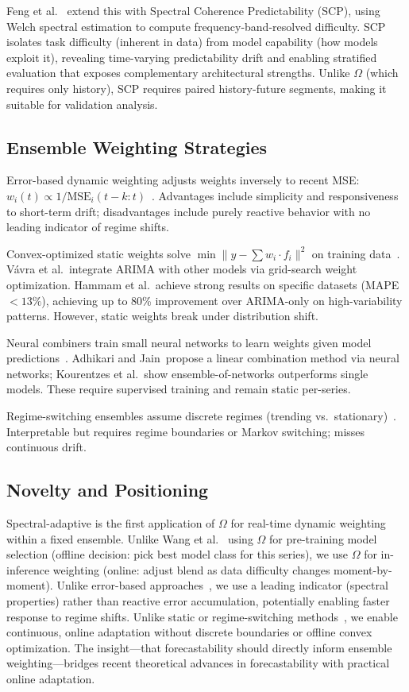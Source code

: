 \documentclass[11pt,letterpaper]{article}
\begin{document}
Feng et al.~\cite{Feng2025} extend this with Spectral Coherence Predictability (SCP), using Welch spectral estimation to compute frequency-band-resolved difficulty. SCP isolates task difficulty (inherent in data) from model capability (how models exploit it), revealing time-varying predictability drift and enabling stratified evaluation that exposes complementary architectural strengths. Unlike $\Omega$ (which requires only history), SCP requires paired history-future segments, making it suitable for validation analysis.

\subsection{Ensemble Weighting Strategies}

Error-based dynamic weighting adjusts weights inversely to recent MSE: $w_i(t) \propto 1/\text{MSE}_i(t-k:t)$~\cite{Sun2017}. Advantages include simplicity and responsiveness to short-term drift; disadvantages include purely reactive behavior with no leading indicator of regime shifts.

Convex-optimized static weights solve $\min \|y - \sum w_i \cdot f_i\|^2$ on training data~\cite{Vvra2026,Hammam2025}. Vávra et al.~integrate ARIMA with other models via grid-search weight optimization. Hammam et al.~achieve strong results on specific datasets (MAPE $< 13\%$), achieving up to 80\% improvement over ARIMA-only on high-variability patterns. However, static weights break under distribution shift.

Neural combiners train small neural networks to learn weights given model predictions~\cite{Adhikari2015,Kourentzes2014}. Adhikari and Jain~propose a linear combination method via neural networks; Kourentzes et al.~show ensemble-of-networks outperforms single models. These require supervised training and remain static per-series.

Regime-switching ensembles assume discrete regimes (trending vs.~stationary)~\cite{Xu2025}. Interpretable but requires regime boundaries or Markov switching; misses continuous drift.

\subsection{Novelty and Positioning}

Spectral-adaptive is the first application of $\Omega$ for real-time dynamic weighting within a fixed ensemble. Unlike Wang et al.~\cite{Wang2025} using $\Omega$ for pre-training model selection (offline decision: pick best model class for this series), we use $\Omega$ for in-inference weighting (online: adjust blend as data difficulty changes moment-by-moment). Unlike error-based approaches~\cite{Sun2017}, we use a leading indicator (spectral properties) rather than reactive error accumulation, potentially enabling faster response to regime shifts. Unlike static or regime-switching methods~\cite{Vvra2026,Xu2025}, we enable continuous, online adaptation without discrete boundaries or offline convex optimization. The insight---that forecastability should directly inform ensemble weighting---bridges recent theoretical advances in forecastability with practical online adaptation.
\end{document}
